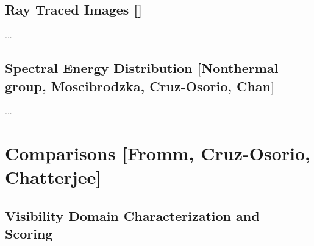 \documentclass[twocolumn,tighten,dvipsnames,linenumbers]{aastex63}
\begin{document}
\subsection{Ray Traced Images
  []}
\label{sec:images}

...

\subsection{Spectral Energy Distribution
  [Nonthermal group, Moscibrodzka, Cruz-Osorio, Chan]}
\label{sec:SED}

...





\section{Comparisons
  [Fromm, Cruz-Osorio, Chatterjee]}
\label{sec:comparisons}

\subsection{Visibility Domain Characterization and Scoring}
\end{document}
